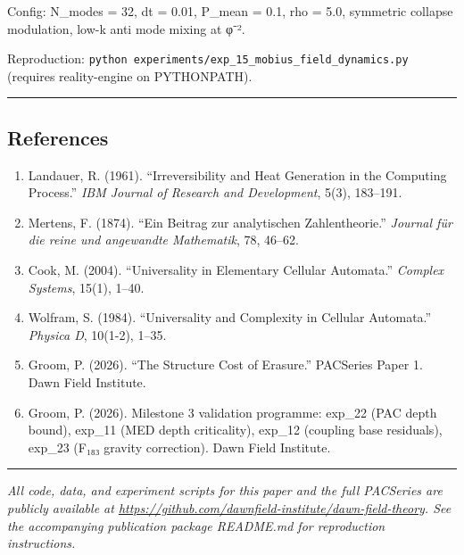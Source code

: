 \documentclass[
  11pt,
  a4paper]{article}
\providecommand{\tightlist}{%
  \setlength{\itemsep}{0pt}\setlength{\parskip}{0pt}}
\begin{document}
Config: N\_modes = 32, dt = 0.01, P\_mean = 0.1, rho = 5.0, symmetric
collapse modulation, low-k anti mode mixing at φ⁻².

Reproduction:
\texttt{python\ experiments/exp\_15\_mobius\_field\_dynamics.py}
(requires reality-engine on PYTHONPATH).

\begin{center}\rule{0.5\linewidth}{0.5pt}\end{center}

\subsection{References}\label{references}

\begin{enumerate}
\def\labelenumi{\arabic{enumi}.}
\tightlist
\item
  Landauer, R. (1961). ``Irreversibility and Heat Generation in the
  Computing Process.'' \emph{IBM Journal of Research and Development},
  5(3), 183--191.
\item
  Mertens, F. (1874). ``Ein Beitrag zur analytischen Zahlentheorie.''
  \emph{Journal für die reine und angewandte Mathematik}, 78, 46--62.
\item
  Cook, M. (2004). ``Universality in Elementary Cellular Automata.''
  \emph{Complex Systems}, 15(1), 1--40.
\item
  Wolfram, S. (1984). ``Universality and Complexity in Cellular
  Automata.'' \emph{Physica D}, 10(1-2), 1--35.
\item
  Groom, P. (2026). ``The Structure Cost of Erasure.'' PACSeries Paper
  1. Dawn Field Institute.
\item
  Groom, P. (2026). Milestone 3 validation programme: exp\_22 (PAC depth
  bound), exp\_11 (MED depth criticality), exp\_12 (coupling base
  residuals), exp\_23 (F₁₈₃ gravity correction). Dawn Field Institute.
\end{enumerate}

\begin{center}\rule{0.5\linewidth}{0.5pt}\end{center}

\emph{All code, data, and experiment scripts for this paper and the full
PACSeries are publicly available at
\url{https://github.com/dawnfield-institute/dawn-field-theory}. See the
accompanying publication package README.md for reproduction
instructions.}
\end{document}
